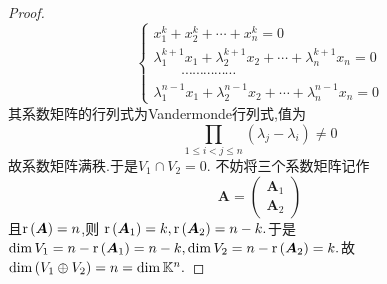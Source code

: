 {\begin{proof}
\[\begin{cases*}
                x_1^{k}+x_2^k+\cdots+x^k_n=0                                        \\
                \lambda_1^{k+1}x_1+\lambda_2^{k+1}x_2+\cdots+\lambda_n^{k+1}x_n=0   \\
                \qquad\cdots\cdots\cdots\cdots\cdots                                \\
                \lambda_{1}^{n-1}x_1+\lambda_2^{n-1}x_2+\cdots+\lambda_n^{n-1}x_n=0
            \end{cases*}
        \]
        其系数矩阵的行列式为Vandermonde行列式,值为
        \[
            \prod_{1\leqslant i<j\leqslant n}
            \left(\lambda_j-\lambda_i\right)
            \neq 0
        \]
        故系数矩阵满秩.于是$V_1\cap V_2=0.$
        不妨将三个系数矩阵记作
        \[
            \bm{A}=\begin{pmatrix}
                \bm{A}_1 \\\bm{A}_2
            \end{pmatrix}
        \]
        且$\mathrm{r} \left(\bm{A}\right)=n$,则
        $\mathrm{r} \left(\bm{A}_1\right)=k,\mathrm{r} \left(\bm{A}_2\right)=n-k.$于是$\dim V_1=n-\mathrm{r} \left(\bm{A}_1\right)=n-k,
            \dim V_2=n-\mathrm{r} \left(\bm{A}_2\right)=k.$故$\dim\left(V_1\oplus V_2\right)=n=\dim \mathbb{K} ^n.$
    \end{proof}
}
